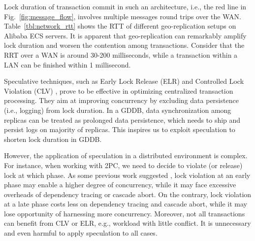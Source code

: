 \documentclass[conference]{IEEEtran}
\begin{document}
\begin{table}[tbp]
  \centering
  \caption{network message RTT on Alibaba ECS}

\label{tbl:network_rtt}
\end{table}

Lock duration of transaction commit in such an architecture, i.e., the red line in Fig.~\ref{fig:message_flow}, involves multiple messages round trips over the WAN.
Table~\ref{tbl:network_rtt} shows the RTT of different geo-replication setups on Alibaba ECS servers.
It is apparent that geo-replication can remarkably amplify lock duration and worsen the contention among transactions.
Consider that the RRT over a WAN is around 30-200 milliseconds, while a transaction within a LAN can be finished within 1 millisecond.

Speculative techniques, such as Early Lock Release (ELR) \cite{EfficientLocking:conf/vldb/KimuraGK12} and Controlled Lock Violation (CLV)
\cite{CLV:conf/sigmod/GraefeLKTV13}, prove to be effective in optimizing centralized transaction processing.
They aim at improving concurrency by excluding data persistence (i.e., logging) from lock duration.
In a GDDB, data synchronization among replicas can be treated as prolonged data persistence, which needs to ship and persist logs on majority of replicas.
This inspires us to exploit speculation to shorten lock duration in GDDB.

However, the application of speculation in a distributed environment is complex.
For instance, when working with 2PC, we need to decide to violate (or release) lock at which phase.
As some previous work suggested \cite{CLV:conf/sigmod/GraefeLKTV13}, lock violation at an early phase may enable a higher degree of concurrency,
while it may face excessive overheads of dependency tracing or cascade abort.
On the contrary, lock violation at a late phase costs less on dependency tracing and cascade abort,
while it may lose opportunity of harnessing more concurrency.
Moreover, not all transactions can benefit from CLV or ELR, e.g., workload with little conflict.
It is unnecessary and even harmful to apply speculation to all cases.
\end{document}
